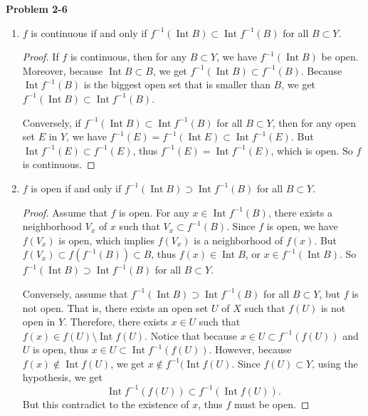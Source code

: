 \documentclass[12pt, a4paper]{article}
\theoremstyle{plain}
\DeclareMathOperator{\inter}{Int}
\newenvironment{problem}[2][Problem]
    { \begin{mdframed}[backgroundcolor=gray!20] \textbf{#1 #2} \\}
    {  \end{mdframed}}
\begin{document}
\begin{problem}{2-6}
\begin{enumerate}[label=(\alph*)]
\begin{proof}
	The opposite direction is by mathematical contradiction. Assume that $\overline{f(A)}\subset f(\overline{A})$ for all $A\subset X$ and there exists a closed subset $E$ or $X$ such that $f(E)$ is not closed. Because $E\subset X$, by the assumption, we have $\overline{f(E)}\subset f(\overline{E})=f(E)$. But $f(E)\subset \overline{f(E)}$, so $f(E)= \overline{f(E)}$, which yields $f(E)$ is closed, contradiction. So $f$ is closed.
	\end{proof}

\item $f$ is continuous if and only if $f^{-1}(\inter{B})\subset \inter{f^{-1}(B)}$ for all $B\subset Y$.
	\begin{proof}
	If $f$ is continuous, then for any $B\subset Y$, we have $f^{-1}(\inter{B})$ be open. Moreover, because $\inter{B}\subset B$, we get $f^{-1}(\inter{B})\subset f^{-1}(B)$. Because $\inter{f^{-1}(B)}$ is the biggest open set that is smaller than $B$, we get $f^{-1}(\inter{B})\subset \inter{f^{-1}(B)}$.
	
	Conversely, if $f^{-1}(\inter{B})\subset \inter{f^{-1}(B)}$ for all $B\subset Y$, then for any open set $E$ in $Y$, we have $f^{-1}(E)=f^{-1}(\inter{E})\subset \inter{f^{-1}(E)}$. But $\inter{f^{-1}(E)}\subset f^{-1}(E)$, thus $f^{-1}(E)=\inter{f^{-1}(E)}$, which is open. So $f$ is continuous.
	\end{proof}
	
\pagebreak

\item $f$ is open if and only if $f^{-1}(\inter{B})\supset\inter{f^{-1}(B)}$ for all $B\subset Y$.
	\begin{proof}
	Assume that $f$ is open. For any $x\in \inter{f^{-1}(B)}$, there exists a neighborhood $V_x$ of $x$ such that $V_x\subset f^{-1}(B)$. Since $f$ is open, we have $f(V_x)$ is open, which implies $f(V_x)$ is a neighborhood of $f(x)$. But $f(V_x)\subset f(f^{-1}(B))\subset B$, thus $f(x)\in \inter{B}$, or $x\in f^{-1}(\inter{B})$. So $f^{-1}(\inter{B})\supset\inter{f^{-1}(B)}$ for all $B\subset Y$.
	
	Conversely, assume that $f^{-1}(\inter{B})\supset\inter{f^{-1}(B)}$ for all $B\subset Y$, but $f$ is not open. That is, there exists an open set $U$ of $X$ such that $f(U)$ is not open in $Y$. Therefore, there exists $x\in U$ such that $f(x)\in f(U)\setminus \inter{f(U)}$. Notice that because $x\in U\subset f^{-1}(f(U))$ and $U$ is open, thus $x\in U\subset \inter{f^{-1}(f(U))}$. However, because $f(x)\notin \inter{f(U)}$, we get $x\notin f^{-1}(\inter{f(U)}$. Since $f(U)\subset Y$, using the hypothesis, we get
	\[
	\inter{f^{-1}(f(U))}\subset f^{-1}(\inter{f(U)}).
	\]
	But this contradict to the existence of $x$, thus $f$ must be open.
	\end{proof}
\end{enumerate}
\end{problem}
\end{document}
